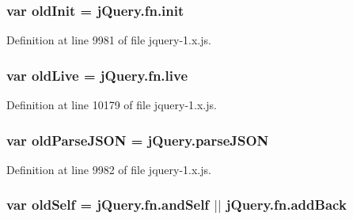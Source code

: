 \subsubsection[{\texorpdfstring{old\+Init}{oldInit}}]{\setlength{\rightskip}{0pt plus 5cm}var old\+Init = {\bf j\+Query.\+fn.\+init}}\hypertarget{jquery-1_8x_8js_ac9b9dd6c007ba04bbd153bc80d68f911}{}\label{jquery-1_8x_8js_ac9b9dd6c007ba04bbd153bc80d68f911}


Definition at line 9981 of file jquery-\/1.\+x.\+js.

\subsubsection[{\texorpdfstring{old\+Live}{oldLive}}]{\setlength{\rightskip}{0pt plus 5cm}var old\+Live = {\bf j\+Query.\+fn.\+live}}\hypertarget{jquery-1_8x_8js_aae143814bd850fc333932060b8af58c3}{}\label{jquery-1_8x_8js_aae143814bd850fc333932060b8af58c3}


Definition at line 10179 of file jquery-\/1.\+x.\+js.

\subsubsection[{\texorpdfstring{old\+Parse\+J\+S\+ON}{oldParseJSON}}]{\setlength{\rightskip}{0pt plus 5cm}var old\+Parse\+J\+S\+ON = {\bf j\+Query.\+parse\+J\+S\+ON}}\hypertarget{jquery-1_8x_8js_ad5591e1f43cb452fcb2ad4500ecd21c0}{}\label{jquery-1_8x_8js_ad5591e1f43cb452fcb2ad4500ecd21c0}


Definition at line 9982 of file jquery-\/1.\+x.\+js.

\subsubsection[{\texorpdfstring{old\+Self}{oldSelf}}]{\setlength{\rightskip}{0pt plus 5cm}var old\+Self = {\bf j\+Query.\+fn.\+and\+Self} $\vert$$\vert$ j\+Query.\+fn.\+add\+Back}\hypertarget{jquery-1_8x_8js_aa0b21a3e53cfac16756dbc265b780294}{}\label{jquery-1_8x_8js_aa0b21a3e53cfac16756dbc265b780294}


